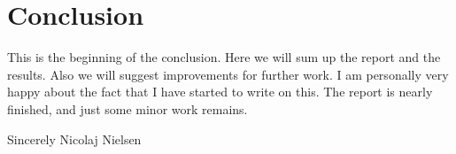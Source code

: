 \section{Conclusion}
This is the beginning of the conclusion. Here we will sum up the report and the results. Also we will suggest improvements for further work. I am personally very happy about the fact that I have started to write on this. The report is nearly finished, and just some minor work remains.

Sincerely \newline Nicolaj Nielsen